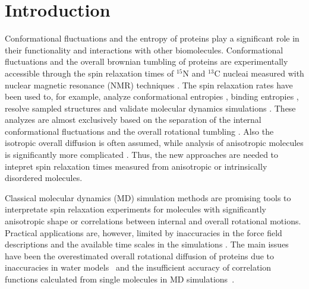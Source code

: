 \documentclass[pre,aps,floatfix,authordate1-4,twocolumn]{revtex4-1}
\begin{document}

\maketitle %



\section{Introduction}
Conformational fluctuations and the entropy of proteins
play a significant role in their functionality
and interactions with other biomolecules.
Conformational fluctuations and the overall brownian tumbling of proteins
are experimentally accessible through the 
spin relaxation times of $^{15}$N and $^{13}$C nucleai measured
with nuclear magnetic resonance (NMR) 
techniques \cite{jarymowycz06,korzhnev01,mulder01,eisenmesser05,bedem15,lewandowski15,lamley15}. 
The spin relaxation rates have been used to, for example, analyze
conformational entropies \cite{yang96,kasinath13,allner15,jarymowycz06}, binding entropies \cite{akke93,jarymowycz06},
resolve sampled structures \cite{mulder01,eisenmesser05,bedem15,medina14}
and validate molecular dynamics simulations \cite{best04,showalter07a,showalter07b,maragakis08,trbovic08}.
These analyzes are almost exclusively based on the
separation of the internal conformational fluctuations 
and the overall rotational tumbling \cite{wennerstrom79,Lipari82}.
Also the isotropic overall diffusion is often assumed, while
analysis of anisotropic molecules is significantly more
complicated \cite{woessner62,shimizu62,jarymowycz06,korzhnev01,luginbuhl97,hall04}.
Thus, the new approaches are needed to intepret spin relaxation times
measured from anisotropic or intrinsically disordered molecules.

Classical molecular dynamics (MD) simulation methods are
promising tools to interpretate spin relaxation experiments
for molecules with significantly anisotropic shape or correlations between
internal and overall rotational motions. Practical applications
are, however, limited by inaccuracies in the force field descriptions
and the available time scales in the simulations \cite{prompers02,maragakis08,trbovic08,wong08,anderson12}.
The main issues have been the overestimated overall rotational diffusion of proteins
due to inaccuracies in water models~\cite{wong08} and the
insufficient accuracy of correlation functions calculated from
single molecules in MD simulations~\cite{lu06,anderson12}.
\end{document}
